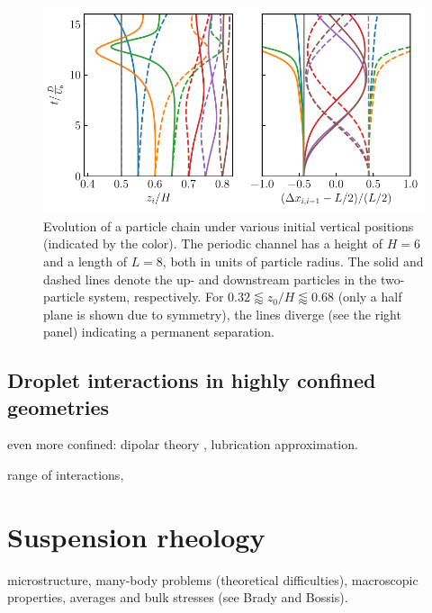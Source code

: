 \begin{figure}%
  \centering
  \includegraphics[width=0.9\columnwidth]{H3.pdf}
  \caption{Evolution of a particle chain under various initial vertical positions (indicated by the color). The periodic channel has a height of $H=6$ and a length of $L=8$, both in units of particle radius. The solid and dashed lines denote the up- and downstream particles in the two-particle system, respectively. For $0.32 \lessapprox z_0/H \lessapprox 0.68$ (only a half plane is shown due to symmetry), the lines diverge (see the right panel) indicating a permanent separation.}
  \label{fig:xover}
\end{figure}


\subsection{Droplet interactions in highly confined geometries}

even more confined:
dipolar theory \citep{Cui2004,Beatus2006,Janssen2012,Uspal2013,Desreumaux,zhu_gallaire_2016,q2d_Beatus,Diamant},
lubrication approximation.

range of interactions,


\section{Suspension rheology}
\label{sec:sus-rheo}

microstructure,
many-body problems (theoretical difficulties),
macroscopic properties, averages and bulk stresses (see Brady and Bossis).

